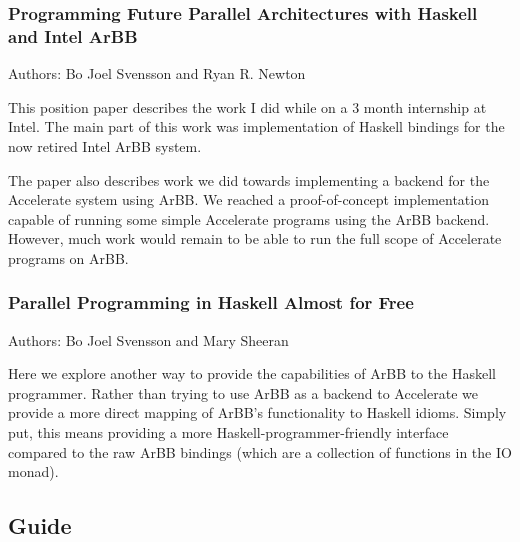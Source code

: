 \documentclass[a4paper]{book}
\newcommand{\paperARBB}{Programming Future Parallel Architectures with Haskell and Intel ArBB}
\newcommand{\paperEMBARBB}{Parallel Programming in Haskell Almost for Free}
\begin{document}
\subsubsection{\paperARBB}

Authors: Bo Joel Svensson and Ryan R. Newton

\vspace{5mm}

\noindent This position paper describes the work I did while on a 3 month internship at 
Intel. The main part of this work was implementation of Haskell bindings 
for the now retired Intel ArBB system. 

The paper also describes work we did towards implementing a backend for the 
Accelerate system using ArBB. We reached a proof-of-concept implementation 
capable of running some simple Accelerate programs using the ArBB backend.
However, much work would remain to be able to run the full scope of Accelerate 
programs on ArBB.  

\subsubsection{\paperEMBARBB}

Authors: Bo Joel Svensson and Mary Sheeran 

\vspace{5mm}

\noindent Here we explore another way to provide the capabilities of ArBB to the 
Haskell programmer. Rather than trying to use ArBB as a backend to Accelerate 
we provide a more direct mapping of ArBB's functionality to Haskell idioms. 
Simply put, this means providing a more Haskell-programmer-friendly interface compared
to the raw ArBB bindings (which are a collection of functions in the IO monad). 

\subsection*{Guide} 




\tableofcontents


\cleardoublepage
\clearpage

\pagestyle{fancy}
\fancyfoot{}
\fancyhead[LO]{}
\fancyhead[RO]{\leftmark}
\renewcommand{\headrulewidth}{0.0pt}
\fancyhead[LE,RO]{\thepage}

%
%
\end{document}
